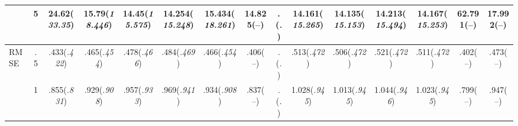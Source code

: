 \documentclass{article}
\begin{document}
\begin{table}[tbp]
{\begin{tabularx}{\textwidth}{lCCCCCCCCCCCCCC}
&5&24.62\newline (\emph{33.35})&15.79\newline (\emph{18.446})&14.45\newline (\emph{15.575})&14.254\newline (\emph{15.248})&15.434\newline (\emph{18.261})&14.825\newline (--)&.\newline (\emph{.})&14.161\newline (\emph{15.265})&14.135\newline (\emph{15.153})&14.213\newline (\emph{15.494})&14.167\newline (\emph{15.253})&62.791\newline (--)&17.992\newline (--) \tabularnewline
\midrule RMSE&.5&.433\newline (\emph{.422})&.465\newline (\emph{.454})&.478\newline (\emph{.466})&.484\newline (\emph{.469})&.466\newline (\emph{.454})&.406\newline (--)&.\newline (\emph{.})&.513\newline (\emph{.472})&.506\newline (\emph{.472})&.521\newline (\emph{.472})&.511\newline (\emph{.472})&.402\newline (--)&.473\newline (--) \tabularnewline
&1&.855\newline (\emph{.831})&.929\newline (\emph{.908})&.957\newline (\emph{.933})&.969\newline (\emph{.941})&.934\newline (\emph{.908})&.837\newline (--)&.\newline (\emph{.})&1.028\newline (\emph{.945})&1.013\newline (\emph{.945})&1.044\newline (\emph{.946})&1.023\newline (\emph{.945})&.799\newline (--)&.947\newline (--) \tabularnewline

\end{tabularx}}
\end{table}
\end{document}
